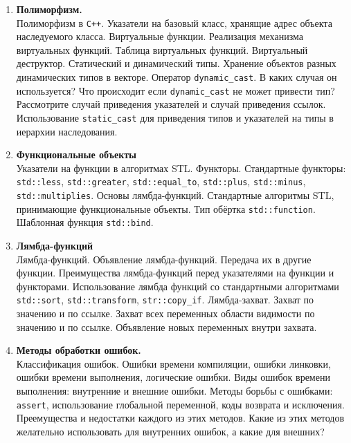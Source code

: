 \documentclass{article}
\begin{document}
\begin{enumerate}
\item \textbf{Полиморфизм.}\\
Полиморфизм в \texttt{C++}. Указатели на базовый класс, хранящие адрес объекта наследуемого класса.  Виртуальные функции. Реализация механизма виртуальных функций. Таблица виртуальных функций. Виртуальный деструктор. Статический и динамический типы. Хранение объектов разных динамических типов в векторе. Оператор \texttt{dynamic\_cast}. В каких случая он используется? Что происходит если \texttt{dynamic\_cast} не может привести тип? Рассмотрите случай приведения указателей и случай приведения ссылок.
Использование \texttt{static\_cast} для приведения типов и указателей на типы в иерархии наследования. 


\item \textbf{Функциональные объекты}\\
Указатели на функции в алгоритмах STL. Функторы. Стандартные функторы: \texttt{std::less}, \texttt{std::greater}, \texttt{std::equal\_to}, \texttt{std::plus}, \texttt{std::minus}, \texttt{std::multiplies}. Основы лямбда-функций. Стандартные алгоритмы STL, принимающие функциональные объекты. Тип обёртка \texttt{std::function}. Шаблонная функция \texttt{std::bind}.

\item \textbf{Лямбда-функций}\\
Лямбда-функций. Объявление лямбда-функций. Передача их в другие функции. Преимущества лямбда-функций перед указателями на функции и функторами. Использование лямбда функций со стандартными алгоритмами \texttt{std::sort}, \texttt{std::transform}, \texttt{str::copy\_if}. Лямбда-захват. Захват по значению и по ссылке. Захват всех переменных области видимости по значению и по ссылке. Объявление новых переменных внутри захвата.


\item \textbf{Методы обработки ошибок.}\\
Классификация ошибок. Ошибки времени компиляции, ошибки линковки, ошибки времени выполнения, логические ошибки.
Виды ошибок времени выполнения: внутренние и внешние ошибки. Методы борьбы с ошибками: \texttt{assert}, использование глобальной переменной, коды возврата и исключения. Преемущества и недостатки каждого из этих методов. Какие из этих методов желательно использовать для внутренних ошибок, а какие для внешних?



\end{enumerate}
\end{document}
